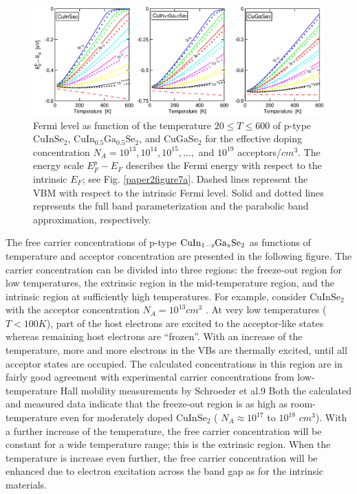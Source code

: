 \documentclass[a4paper, 12pt, titlepage,oneside,drop]{kthesis}
\begin{document}
\begin{figure}[H]
\begin{center}
\includegraphics[scale=.6]{paper2figure8.eps}
\end{center}
\caption{Fermi level as function of the temperature $20\leq T \leq600$ of p-type $\mathrm {CuInSe_2}$, $\mathrm {CuIn_{0.5}Ga_{0.5}Se_2}$, and $\mathrm {CuGaSe_2}$ for the effective doping concentration 
$N_A = 10^{13}, 10^{14},10^{15}, …,$ and $10^{19}$  acceptors/$cm^3$. The energy scale $E_F^p - E_F$ describes the Fermi energy with respect to the
intrinsic $E_F$; see Fig. \ref{paper2figure7a}. Dashed lines represent the VBM with respect to the intrinsic Fermi level. Solid and dotted lines represents the full band parameterization and the parabolic band approximation,
 respectively.}
\label{paper2figure8}
\end{figure}

The free carrier concentrations of p-type $\mathrm { CuIn_{1-\textit{x}}Ga_{x}Se_2}$ as functions of temperature and acceptor concentration are presented in the following figure. The carrier concentration
 can be divided into three regions: the freeze-out region for low temperatures, the extrinsic region in the mid-temperature region, and the intrinsic region at
 sufficiently high temperatures. For example, consider $\mathrm {CuInSe_2}$ with the acceptor concentration $N_A = 10^{13} cm^3$ . At very low temperatures ($T < 100 K$), 
part of the host electrons are excited to the acceptor-like states whereas remaining host electrons are “frozen”. With an increase of the temperature, more and more
 electrons in the VBs are thermally excited, until all acceptor states are occupied. The calculated concentrations in this region are in fairly good agreement with 
experimental carrier concentrations from low-temperature Hall mobility measurements by Schroeder et al.9  Both the calculated and measured data indicate that the 
freeze-out region is as high as room-temperature even for moderately doped $\mathrm {CuInSe_2}$ ( $N_A \approx 10^{17}$ to $10^{18}$  $cm^3 $). 
With a further increase of the temperature, the free carrier concentration will be constant for a wide temperature range; this is the extrinsic region.
 When the temperature is increase even further, the free carrier concentration will be enhanced due to electron excitation across the band gap as for 
the intrinsic materials.
\end{document}
